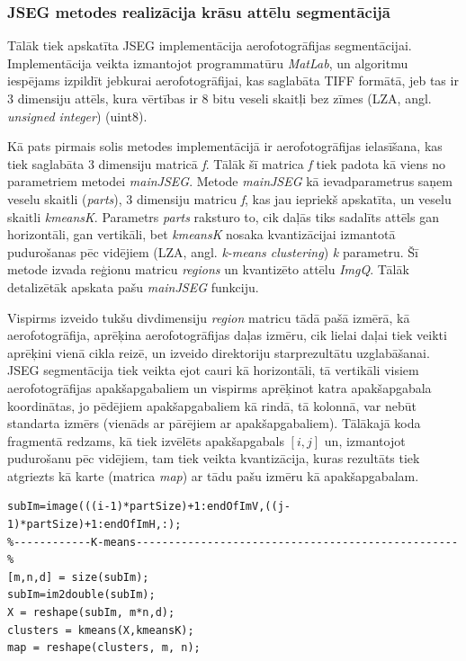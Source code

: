 \documentclass[12pt,paper=a4]{report}
\begin{document}
\subsubsection{JSEG metodes realizācija krāsu attēlu segmentācijā}Tālāk tiek apskatīta JSEG implementācija aerofotogrāfijas segmentācijai. Implementācija veikta izmantojot programmatūru \textit{MatLab}, un algoritmu iespējams izpildīt jebkurai aerofotogrāfijai, kas saglabāta TIFF formātā, jeb tas ir 3 dimensiju attēls, kura vērtības ir 8 bitu veseli skaitļi bez zīmes (LZA, angl. \textit{unsigned integer}) (uint8). \par
Kā pats pirmais solis metodes implementācijā ir aerofotogrāfijas ielasīšana, kas tiek saglabāta 3 dimensiju matricā \textit{f}. Tālāk šī matrica \textit{f} tiek padota kā viens no parametriem metodei \textit{mainJSEG}. Metode \textit{mainJSEG} kā ievadparametrus saņem veselu skaitli (\textit{parts}), 3 dimensiju matricu \textit{f}, kas jau iepriekš apskatīta, un veselu skaitli \textit{kmeansK}. Parametrs \textit{parts} raksturo to, cik daļās tiks sadalīts attēls gan horizontāli, gan vertikāli, bet \textit{kmeansK} nosaka kvantizācijai izmantotā pudurošanas pēc vidējiem (LZA, angl. \textit{k-means clustering}) \textit{k} parametru. Šī metode izvada reģionu matricu \textit{regions} un kvantizēto attēlu \textit{ImgQ}. Tālāk detalizētāk apskata pašu \textit{mainJSEG} funkciju. \par
Vispirms izveido tukšu divdimensiju \textit{region} matricu tādā pašā izmērā, kā aerofotogrāfija, aprēķina aerofotogrāfijas daļas izmēru, cik lielai daļai tiek veikti aprēķini vienā cikla reizē, un izveido direktoriju starprezultātu uzglabāšanai. JSEG segmentācija tiek veikta ejot cauri kā horizontāli, tā vertikāli visiem aerofotogrāfijas apakšapgabaliem un vispirms aprēķinot katra apakšapgabala koordinātas, jo pēdējiem apakšapgabaliem kā rindā, tā kolonnā, var nebūt standarta izmērs (vienāds ar pārējiem ar apakšapgabaliem). Tālākajā koda fragmentā redzams, kā tiek izvēlēts apakšapgabals $[i,j]$ un, izmantojot pudurošanu pēc vidējiem, tam tiek veikta kvantizācija, kuras rezultāts tiek atgriezts kā karte (matrica \textit{map}) ar tādu pašu izmēru kā apakšapgabalam.
\begin{lstlisting}
subIm=image(((i-1)*partSize)+1:endOfImV,((j-1)*partSize)+1:endOfImH,:);
%------------K-means--------------------------------------------------%
[m,n,d] = size(subIm);
subIm=im2double(subIm);
X = reshape(subIm, m*n,d);
clusters = kmeans(X,kmeansK);
map = reshape(clusters, m, n);
\end{lstlisting}\par
\end{document}
